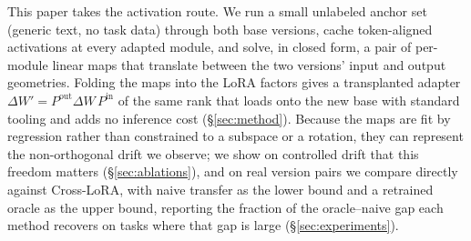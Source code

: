 This paper takes the activation route. We run a small unlabeled anchor set
(generic text, no task data) through both base versions, cache token-aligned
activations at every adapted module, and solve, in closed form, a pair of
per-module linear maps that translate between the two versions' input and
output geometries. Folding the maps into the LoRA factors gives a transplanted
adapter $\Delta W'=P^{\mathrm{out}}\Delta W\,P^{\mathrm{in}}$ of the same rank
that loads onto the new base with standard tooling and adds no inference cost
(\S\ref{sec:method}). Because the maps are fit by regression rather than
constrained to a subspace or a rotation, they can represent the non-orthogonal
drift we observe; we show on controlled drift that this freedom matters
(\S\ref{sec:ablations}), and on real version pairs we compare directly against
Cross-LoRA, with naive transfer as the lower bound and a retrained oracle as
the upper bound, reporting the fraction of the oracle--naive gap each method
recovers on tasks where that gap is large (\S\ref{sec:experiments}).

